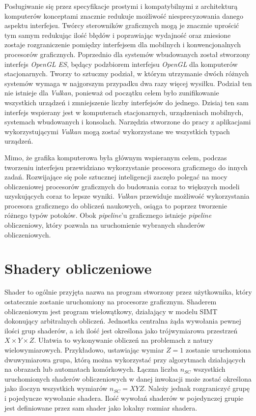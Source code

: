 Posługiwanie się przez specyfikacje prostymi i kompatybilnymi z architekturą komputerów konceptami znacznie redukuje możliwość niesprecyzowania danego aspektu interfejsu.
Twórcy sterowników graficznych mogą je znacznie uprościć tym samym redukując ilość błędów i poprawiając wydajność oraz zniesione zostaje rozgraniczenie pomiędzy interfejsem dla mobilnych i konwencjonalnych procesorów graficznych.
Poprzednio dla systemów wbudowanych został stworzony interfejs \textit{OpenGL ES}, będący podzbiorem interfejsu \textit{OpenGL} dla komputerów stacjonarnych.
Tworzy to sztuczny podział, w którym utrzymanie dwóch różnych systemów wymaga w najgorszym przypadku dwa razy więcej wysiłku.
Podział ten nie istnieje dla \textit{Vulkan}, ponieważ od początku celem było zunifikowanie wszystkich urządzeń i zmniejszenie liczby interfejsów do jednego.
Dzisiaj ten sam interfejs wspierany jest w komputerach stacjonarnych, urządzeniach mobilnych, systemach wbudowanych i konsolach.
Narzędzia stworzone do pracy z aplikacjami wykorzystującymi \textit{Vulkan} mogą zostać wykorzystane we wszystkich typach urządzeń.

Mimo, że grafika komputerowa była głównym wspieranym celem, podczas tworzeniu interfejsu przewidziano wykorzystanie procesora graficznego do innych zadań.
Rozwijające się pole sztucznej inteligencji zaczęło polegać na mocy obliczeniowej procesorów graficznych do budowania coraz to większych modeli uzyskujących coraz to lepsze wyniki.
\textit{Vulkan} przewiduje możliwość wykorzystania procesora graficznego do obliczeń naukowych, osiąga to poprzez tworzenie różnego typów potoków.
Obok \textit{pipeline}'u graficznego istnieje \textit{pipeline} obliczeniowy, który pozwala na uruchomienie wybranych shaderów obliczeniowych.

\section{Shadery obliczeniowe}
\label{sec:shader_comp}

Shader to ogólnie przyjęta nazwa na program stworzony przez użytkownika, który ostatecznie zostanie uruchomiony na procesorze graficznym.
Shaderem obliczeniowym jest program wielowątkowy, działający w modelu SIMT dokonujący arbitralnych obliczeń.
Jednostka centralna żąda wywołania pewnej ilości grup shaderów, a ich ilość jest określona jako trójwymiarowa przestrzeń $X \times Y \times Z$.
Ułatwia to wykonywanie obliczeń na problemach z natury wielowymiarowych.
Przykładowo, ustawiając wymiar $Z = 1$ zostanie uruchomiona dwuwymiarowa grupa, którą można wykorzystać przy algorytmach działających na obrazach lub automatach komórkowych.
Łączna liczba $n_{SC}$ wszystkich uruchomionych shaderów obliczeniowych w danej inwokacji może zostać określona jako iloczyn wszystkich wymiarów $n_{SC} = XYZ$.
Należy jednak rozgraniczyć grupę i pojedyncze wywołanie shadera.
Ilość wywołań shaderów w pojedynczej grupie jest definiowane przez sam shader jako lokalny rozmiar shadera.

